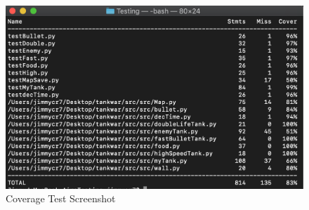 \documentclass[12pt, titlepage]{article}
\begin{document}
\begin{figure}
\centering
\includegraphics[scale=0.7]{coverage.png}
\caption{Coverage Test Screenshot}
\label{Coverage Test}
\end{figure}




\end{document}
